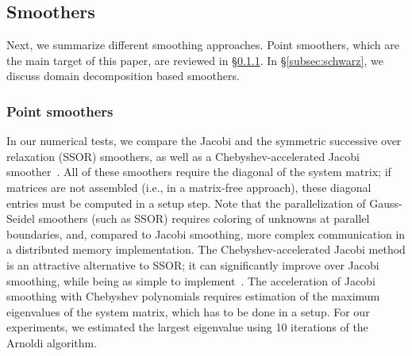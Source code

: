 \documentclass[smallcondensed,final]{svjour3}     %
\begin{document}




\subsection{Smoothers}\label{subsec:smoothers}
Next, we summarize different smoothing approaches. Point smoothers,
which are the main target of this paper, are reviewed in
\S\ref{subsec:ptsmoothers}. In \S\ref{subsec:schwarz}, we discuss
domain decomposition based smoothers.


\subsubsection{Point smoothers}\label{subsec:ptsmoothers}
In our numerical tests, we compare the Jacobi and the symmetric successive over
relaxation (SSOR) smoothers, as well as a Chebyshev-accelerated Jacobi
smoother~\cite{Brandt77}. All of these smoothers require the diagonal of the
system matrix; if matrices are not assembled (i.e., in a matrix-free approach),
these diagonal entries must be computed in a setup step.  Note that the
parallelization of Gauss-Seidel smoothers (such as SSOR) requires coloring of
unknowns at parallel boundaries, and, compared to Jacobi smoothing, more
complex communication in a distributed memory implementation. The
Chebyshev-accelerated Jacobi method is an attractive alternative to SSOR; it
can significantly improve over Jacobi smoothing, while being as simple to
implement~\cite{AdamsBrezinaHuEtAl03}. The acceleration of Jacobi smoothing
with Chebyshev polynomials requires estimation of the maximum eigenvalues of
the system matrix, which has to be done in a setup. For our experiments, we
estimated the largest eigenvalue using 10 iterations of the Arnoldi algorithm.
\end{document}
